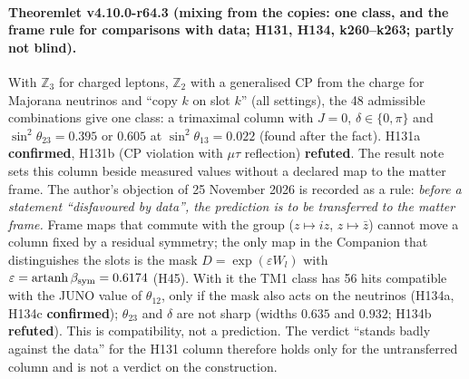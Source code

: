 \paragraph{Theoremlet v4.10.0-r64.3 (mixing from the copies: one class, and the frame rule for comparisons with data; H131, H134, k260--k263; partly not blind).}
With \(\mathbb Z_3\) for charged leptons, \(\mathbb Z_2\) with a generalised CP from the charge for Majorana neutrinos and ``copy \(k\) on slot
\(k\)'' (all settings), the 48 admissible combinations give one class: a trimaximal column with \(J=0\), \(\delta\in\{0,\pi\}\) and
\(\sin^2\theta_{23}=0.395\) or \(0.605\) at \(\sin^2\theta_{13}=0.022\) (found after the fact).  H131a \textbf{confirmed}, H131b (CP violation with
\(\mu\tau\) reflection) \textbf{refuted}.  The result note sets this column beside measured values without a declared map to the matter frame.
The author's objection of 25 November 2026 is recorded as a rule: \emph{before a statement ``disfavoured by data'', the prediction is to be
transferred to the matter frame.}  Frame maps that commute with the group (\(z\mapsto iz\), \(z\mapsto\bar z\)) cannot move a column fixed by a
residual symmetry; the only map in the Companion that distinguishes the slots is the mask \(D=\exp(\varepsilon W_l)\) with
\(\varepsilon=\operatorname{artanh}\beta_{\rm sym}=0.6174\) (H45).  With it the TM1 class has 56 hits compatible with the JUNO value of
\(\theta_{12}\), only if the mask also acts on the neutrinos (H134a, H134c \textbf{confirmed}); \(\theta_{23}\) and \(\delta\) are not sharp
(widths \(0.635\) and \(0.932\); H134b \textbf{refuted}).  This is compatibility, not a prediction.  The verdict ``stands badly against the data''
for the H131 column therefore holds only for the untransferred column and is not a verdict on the construction.

